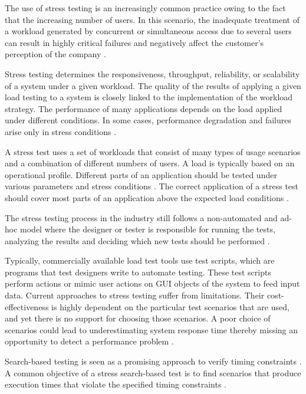 \documentclass{bmcart}
\begin{document}
The use of stress testing is an increasingly common practice owing to the fact that the increasing number of users. In this scenario, the inadequate treatment of a workload generated by concurrent or simultaneous access due to several users can result in highly critical failures and negatively affect the customer's perception of the company \citep{Draheim2006b} \citep{Jiang2010}. 

Stress testing determines the responsiveness, throughput, reliability, or scalability of a system under a given workload. The quality of the results of applying a given load testing to a system is closely linked to the implementation of the workload strategy. The performance of many applications depends on the load applied under different conditions. In some cases, performance degradation and failures arise only in stress conditions \citep{Garousi2010} \citep{Jiang2010}.


A stress test uses a set of workloads that consist of many types of usage scenarios and a combination of different numbers of users. A load is typically based on an operational profile. Different parts of an application should be tested under various parameters and stress conditions \citep{Babbar2011}. The correct application of a stress test should cover most parts of an application above the expected load conditions \citep{Draheim2006b}.

The stress testing process in the industry still follows a non-automated and ad-hoc model where the designer or tester is responsible for running the tests, analyzing the results and deciding which new tests should be performed \citep{Lewis2005}. 

Typically, commercially available load test tools use test scripts, which are programs that test designers write to automate testing. These test scripts perform actions or mimic user actions on GUI objects of the system to feed input data. Current approaches to stress testing suffer from limitations. Their cost-effectiveness is highly dependent on the particular test scenarios that are used, and yet there is no support for choosing those scenarios. A poor choice of scenarios could lead to underestimating system response time thereby missing an opportunity to detect a performance problem \citep{Grechanik2012}.

Search-based testing is seen as a promising approach to verify timing constraints \citep{Afzal2009a}. A common objective of a stress search-based test is to find  scenarios that produce execution times that violate the specified timing constraints \citep{Sullivan}. 
\end{document}
